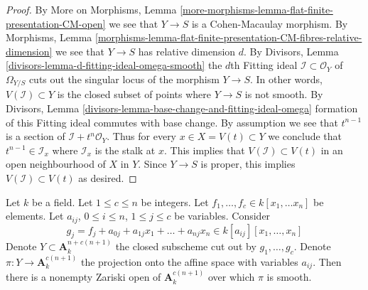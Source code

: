 \begin{proof}
By More on Morphisms, Lemma
\ref{more-morphisms-lemma-flat-finite-presentation-CM-open}
we see that $Y \to S$ is a Cohen-Macaulay morphism.
By Morphisms, Lemma
\ref{morphisms-lemma-flat-finite-presentation-CM-fibres-relative-dimension}
we see that $Y \to S$ has relative dimension $d$.
By Divisors, Lemma \ref{divisors-lemma-d-fitting-ideal-omega-smooth}
the $d$th Fitting ideal $\mathcal{I} \subset \mathcal{O}_Y$
of $\Omega_{Y/S}$ cuts out the singular locus of the morphism $Y \to S$.
In other words, $V(\mathcal{I}) \subset Y$ is the closed subset
of points where $Y \to S$ is not smooth.
By Divisors, Lemma \ref{divisors-lemma-base-change-and-fitting-ideal-omega}
formation of this Fitting ideal commutes with base change.
By assumption we see that $t^{n - 1}$ is a section of
$\mathcal{I} + t^n\mathcal{O}_Y$. Thus for every
$x \in X = V(t) \subset Y$ we conclude that
$t^{n - 1} \in \mathcal{I}_x$ where $\mathcal{I}_x$ is the stalk at $x$.
This implies that $V(\mathcal{I}) \subset V(t)$ in an
open neighbourhood of $X$ in $Y$. Since $Y \to S$
is proper, this implies $V(\mathcal{I}) \subset V(t)$
as desired.
\end{proof}

\begin{lemma}
\label{lemma-jouanolou-type-thing}
Let $k$ be a field. Let $1 \leq c \leq n$ be integers.
Let $f_1, \ldots, f_c \in k[x_1, \ldots x_n]$ be elements.
Let $a_{ij}$, $0 \leq i \leq n$, $1 \leq j \leq c$ be
variables. Consider
$$
g_j = f_j + a_{0j} + a_{1j}x_1 + \ldots + a_{nj}x_n \in
k[a_{ij}][x_1, \ldots, x_n]
$$
Denote $Y \subset \mathbf{A}^{n + c(n + 1)}_k$
the closed subscheme cut out by $g_1, \ldots, g_c$.
Denote $\pi : Y \to \mathbf{A}^{c(n + 1)}_k$ the projection
onto the affine space with variables $a_{ij}$.
Then there is a nonempty Zariski open 
of $\mathbf{A}^{c(n + 1)}_k$ over which $\pi$ is smooth.
\end{lemma}

